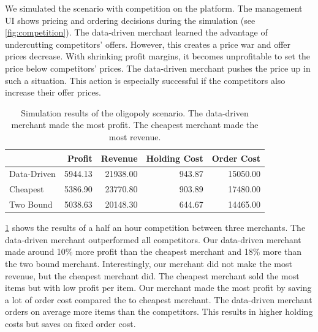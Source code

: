 We simulated the scenario with competition on the \pricewars platform.
The management UI shows pricing and ordering decisions during the simulation (see \cref{fig:competition}).
The data-driven merchant learned the advantage of undercutting competitors' offers.
However, this creates a price war and offer prices decrease.
With shrinking profit margins, it becomes unprofitable to set the price below competitors' prices.
The data-driven merchant pushes the price up in such a situation.
This action is especially successful if the competitors also increase their offer prices.

\begin{table}[t]
	\centering
	\begin{tabular}{ @{}lrrrr@{} }
		\hline
		& Profit & Revenue & Holding Cost & Order Cost \\
		\hline
		Data-Driven & 5944.13 & 21938.00 & 943.87 & 15050.00 \\
		Cheapest & 5386.90 & 23770.80 & 903.89 & 17480.00 \\
		Two Bound & 5038.63 & 20148.30 & 644.67 & 14465.00 \\
		\hline
	\end{tabular}
	\caption{Simulation results of the oligopoly scenario. The data-driven merchant made the most profit. The cheapest merchant made the most revenue.}
	\label{tab:competition}
\end{table}

\cref{tab:competition} shows the results of a half an hour competition between three merchants.
The data-driven merchant outperformed all competitors.
Our data-driven merchant made around 10\% more profit than the cheapest merchant and 18\% more than the two bound merchant.
Interestingly, our merchant did not make the most revenue, but the cheapest merchant did.
The cheapest merchant sold the most items but with low profit per item.
Our merchant made the most profit by saving a lot of order cost compared the to cheapest merchant.
The data-driven merchant orders on average more items than the competitors.
This results in higher holding costs but saves on fixed order cost.


